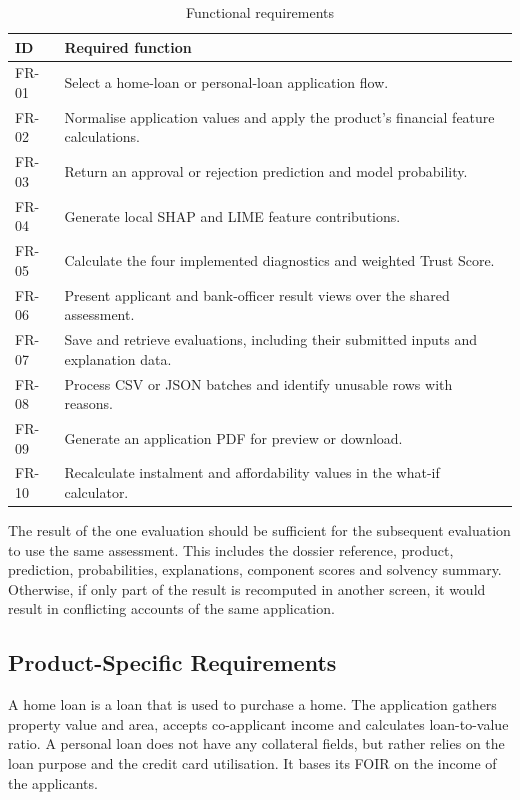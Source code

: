 \begin{table}[htbp]\centering\small
\caption{Functional requirements}\label{tab:functional-requirements}
\begin{tabularx}{\textwidth}{p{1.3cm}X}\toprule
ID & Required function\\\midrule
FR-01 & Select a home-loan or personal-loan application flow.\\
FR-02 & Normalise application values and apply the product's financial feature calculations.\\
FR-03 & Return an approval or rejection prediction and model probability.\\
FR-04 & Generate local SHAP and LIME feature contributions.\\
FR-05 & Calculate the four implemented diagnostics and weighted Trust Score.\\
FR-06 & Present applicant and bank-officer result views over the shared assessment.\\
FR-07 & Save and retrieve evaluations, including their submitted inputs and explanation data.\\
FR-08 & Process CSV or JSON batches and identify unusable rows with reasons.\\
FR-09 & Generate an application PDF for preview or download.\\
FR-10 & Recalculate instalment and affordability values in the what-if calculator.\\\bottomrule
\end{tabularx}\end{table}

The result of the one evaluation should be sufficient for the subsequent evaluation to use the same assessment. This includes the dossier reference, product, prediction, probabilities, explanations, component scores and solvency summary. Otherwise, if only part of the result is recomputed in another screen, it would result in conflicting accounts of the same application.

\subsection{Product-Specific Requirements}
A home loan is a loan that is used to purchase a home. The application gathers property value and area, accepts co-applicant income and calculates loan-to-value ratio. A personal loan does not have any collateral fields, but rather relies on the loan purpose and the credit card utilisation. It bases its FOIR on the income of the applicants.


